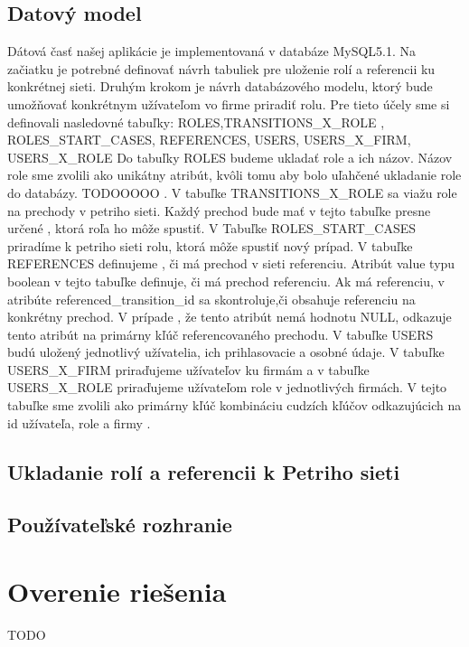 	\subsection{Datový model}
	Dátová časť našej aplikácie je implementovaná v databáze MySQL5.1. Na začiatku je potrebné definovať návrh tabuliek pre uloženie rolí a referencii ku konkrétnej sieti. Druhým krokom je návrh databázového modelu, ktorý bude umožňovať konkrétnym užívateľom vo firme priradiť rolu.
	Pre tieto účely sme si definovali nasledovné tabuľky:
	 ROLES,TRANSITIONS\_X\_ROLE , ROLES\_START\_CASES, REFERENCES, USERS, USERS\_X\_FIRM, USERS\_X\_ROLE 
	Do tabuľky ROLES budeme ukladať role a ich názov. Názov role sme zvolili ako unikátny atribút, kvôli tomu aby bolo uľahčené ukladanie role do databázy. TODOOOOO . V tabuľke TRANSITIONS\_X\_ROLE sa viažu role na prechody v petriho sieti. Každý prechod bude mať v tejto tabuľke presne určené , ktorá roľa ho môže spustiť. V Tabuľke ROLES\_START\_CASES priradíme k petriho sieti rolu, ktorá môže spustiť nový prípad. V tabuľke REFERENCES definujeme , či má prechod v sieti referenciu. Atribút  value typu boolean v tejto tabuľke definuje, či má prechod referenciu. Ak má referenciu, v atribúte referenced\_transition\_id sa skontroluje,či obsahuje referenciu na konkrétny prechod. V prípade , že tento atribút nemá hodnotu NULL, odkazuje tento atribút na primárny kľúč referencovaného prechodu. V tabuľke USERS budú uložený jednotlivý užívatelia, ich prihlasovacie a osobné údaje. V tabuľke USERS\_X\_FIRM priraďujeme užívateľov ku firmám a v tabuľke USERS\_X\_ROLE priraďujeme užívateľom role v jednotlivých firmách. V tejto tabuľke sme zvolili ako primárny kľúč kombináciu cudzích kľúčov odkazujúcich na id užívateľa, role a firmy . 
	
	
	
	\subsection{Ukladanie rolí a referencii k Petriho sieti}
	
	
	
	
	\subsection{Používateľské rozhranie}
	
	

\section{Overenie riešenia}
TODO
	

